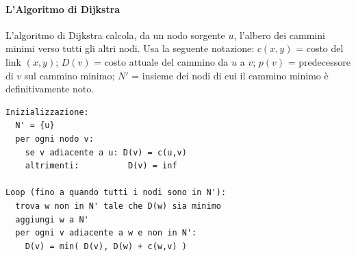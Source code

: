 \paragraph{L'Algoritmo di Dijkstra}
L'algoritmo di Dijkstra calcola, da un nodo sorgente $u$, l'albero dei cammini minimi verso tutti gli altri nodi. Usa la seguente notazione: $c(x,y)$ = costo del link $(x,y)$; $D(v)$ = costo attuale del cammino da $u$ a $v$; $p(v)$ = predecessore di $v$ sul cammino minimo; $N'$ = insieme dei nodi di cui il cammino minimo è definitivamente noto.

\begin{verbatim}
Inizializzazione:
  N' = {u}
  per ogni nodo v:
    se v adiacente a u: D(v) = c(u,v)
    altrimenti:          D(v) = inf

Loop (fino a quando tutti i nodi sono in N'):
  trova w non in N' tale che D(w) sia minimo
  aggiungi w a N'
  per ogni v adiacente a w e non in N':
    D(v) = min( D(v), D(w) + c(w,v) )
\end{verbatim}

